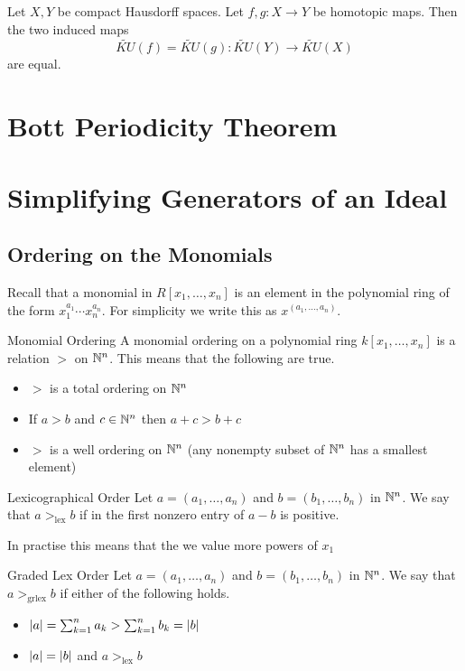 \documentclass[a4paper]{article}
\begin{document}
\begin{prp}{}{} Let $X,Y$ be compact Hausdorff spaces. Let $f,g:X\to Y$ be homotopic maps. Then the two induced maps $$\widetilde{KU}(f)=\widetilde{KU}(g):\widetilde{KU}(Y)\to\widetilde{KU}(X)$$ are equal. 
\end{prp}

\pagebreak
\section{Bott Periodicity Theorem}

\pagebreak
\section{Simplifying Generators of an Ideal}
\subsection{Ordering on the Monomials}
Recall that a monomial in $R[x_1,\dots,x_n]$ is an element in the polynomial ring of the form $x_1^{a_1}\cdots x_n^{a_n}$. For simplicity we write this as $x^{(a_1,\dots,a_n)}$. 

\begin{defn}{Monomial Ordering}{} A monomial ordering on a polynomial ring $k[x_1,\dots,x_n]$ is a relation $>$ on $\mathbb{N}^n$. This means that the following are true. 
\begin{itemize}
\item $>$ is a total ordering on $\mathbb{N}^n$
\item If $a>b$ and $c\in\mathbb{N}^n$ then $a+c>b+c$
\item $>$ is a well ordering on $\mathbb{N}^n$ (any nonempty subset of $\mathbb{N}^n$ has a smallest element)
\end{itemize}
\end{defn}

\begin{defn}{Lexicographical Order}{} Let $a=(a_1,\dots,a_n)$ and $b=(b_1,\dots,b_n)$ in $\mathbb{N}^n$. We say that $a>_{\text{lex}}b$ if in the first nonzero entry of $a-b$ is positive. 
\end{defn}

In practise this means that the we value more powers of $x_1$

\begin{defn}{Graded Lex Order}{} Let $a=(a_1,\dots,a_n)$ and $b=(b_1,\dots,b_n)$ in $\mathbb{N}^n$. We say that $a>_{\text{grlex}}b$ if either of the following holds. 
\begin{itemize}
\item $\abs{a}=\sum_{k=1}^na_k>\sum_{k=1}^nb_k=\abs{b}$
\item $\abs{a}=\abs{b}$ and $a>_{\text{lex}}b$
\end{itemize}
\end{defn}
\end{document}
